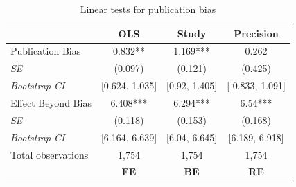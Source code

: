 \begin{table}[!t]
  \centering
  \footnotesize
  \singlespace
  \caption{Linear tests for publication bias}
  \label{tab:PB-FAT}
  \begin{tabular}{
      @{\hskip\tabcolsep\extracolsep}
      l*{3}{c}} %
    \toprule
    \multicolumn{1}{l}{}               &
    \multicolumn{1}{c}{\textbf{OLS}}   &
    \multicolumn{1}{c}{\textbf{Study}} &
    \multicolumn{1}{c}{\textbf{Precision}}                                                \\
    \midrule

    Publication Bias                   & 0.832**        & 1.169***      & 0.262           \\
    \emph{\hspace{0.2cm}SE}            & (0.097)        & (0.121)       & (0.425)         \\
    \emph{\hspace{0.2cm}Bootstrap CI}  & [0.624, 1.035] & [0.92, 1.405] & [-0.833, 1.091] \\
    \addlinespace[0.5em]
    Effect Beyond Bias                 & 6.408***       & 6.294***      & 6.54***         \\
    \emph{\hspace{0.2cm}SE}            & (0.118)        & (0.153)       & (0.168)         \\
    \emph{\hspace{0.2cm}Bootstrap CI}  & [6.164, 6.639] & [6.04, 6.645] & [6.189, 6.918]  \\
    \addlinespace[0.5em]
    Total observations                 & 1,754          & 1,754         & 1,754           \\

    \midrule
    \multicolumn{1}{l}{}               &
    \multicolumn{1}{c}{\textbf{FE}}    &
    \multicolumn{1}{c}{\textbf{BE}}    &
    \multicolumn{1}{c}{\textbf{RE}}                                                       \\
    \midrule


\end{tabular}
\end{table}
